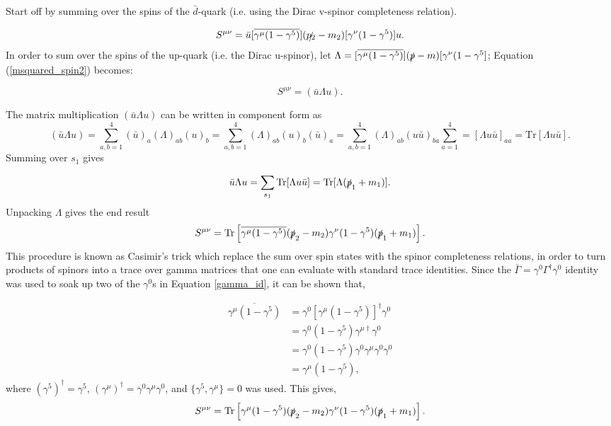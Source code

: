 \documentclass[a4paper,11pt]{article}
\begin{document}
  Start off by summing over the spins of the $\bar{d}$-quark (i.e. using the Dirac v-spinor completeness relation). 
 
\begin{equation}\label{msquared_spin2}
	S^{\mu\nu}= \bar{u} [\overline{\gamma^\mu (1-\gamma^5)}] (\slashed{p_2}-m_2) [\gamma^\nu (1-\gamma^5)] u.
\end{equation}  
In order to sum over the spins of the up-quark (i.e. the Dirac u-spinor), let $\Lambda=   [\overline{\gamma^\mu (1-\gamma^5)}] (\slashed{p}-m) [\gamma^\nu (1-\gamma^5]$; Equation (\ref{msquared_spin2}) becomes:

\begin{equation}\label{msquared_spin2_2}
	S^{\mu\nu}= (\bar{u}\Lambda u).
\end{equation}  

The matrix multiplication $(\bar{u}\Lambda u)$ can be written in component form as 
$$(\bar{u}\Lambda u)= \sum_{a,b=1}^4 (\bar{u})_a (\Lambda)_{ab} (u)_b = \sum_{a,b=1}^4 (\Lambda)_{ab} (u)_b(\bar{u})_a = \sum_{a,b=1}^4 (\Lambda)_{ab} (u\bar{u})_{ba} \sum_{a= 1}^4 = [\Lambda u\bar{u}]_{aa} = \text{Tr}[\Lambda u \bar{u}].$$ Summing over $s_1$ gives 

$$ \bar{u}\Lambda u = \sum_{s_1} \text{Tr}[\Lambda u \bar{u}] = \text{Tr}[\Lambda(\slashed{p}_1+m_1)].$$ Unpacking $\Lambda$ gives the end result $$S^{\mu\nu}= \text{Tr}\left[\overline{\gamma^\mu (1-\gamma^5)} (\slashed{p}_2-m_2) \gamma^\nu (1-\gamma^5)(\slashed{p}_1+m_1)\right].$$ This procedure is known as Casimir's trick \cite{Griffiths:2008zz} which replace the sum over spin states with the spinor completeness relations, in order to turn products of spinors into a trace over gamma matrices that one can evaluate with standard trace identities. Since the $\bar{\Gamma}= \gamma^0 \Gamma^\dagger \gamma^0$ identity was used to soak up two of the $\gamma^0$s in Equation \ref{gamma_id}, it can be shown that,

\begin{equation}\label{overline-id}
	\begin{aligned}
		\overline{\gamma^\mu (1-\gamma^5)} &= \gamma^0 [\gamma^\mu(1-\gamma^5)]^\dagger \gamma^0 \\
		&= \gamma^0(1-\gamma^5)\gamma^{\mu \dagger}\gamma^0 \\
		&= \gamma^0(1-\gamma^5)\gamma^0 \gamma^\mu \gamma^0 \gamma^0 \\
		&= \gamma^\mu (1-\gamma^5),
	\end{aligned}
\end{equation}
where $(\gamma^5)^\dagger = \gamma^5$, $(\gamma^\mu)^\dagger = \gamma^0  \gamma^\mu \gamma^0$, and $\{\gamma^5, \gamma^\mu\}= 0$ was used. This gives,
\begin{equation}\label{M_s}
	S^{\mu\nu}= \text{Tr}\left[\gamma^\mu (1-\gamma^5)(\slashed{p}_2-m_2)\gamma^\nu (1-\gamma^5)(   \slashed{p}_1+m_1) \right].
\end{equation}
\end{document}
